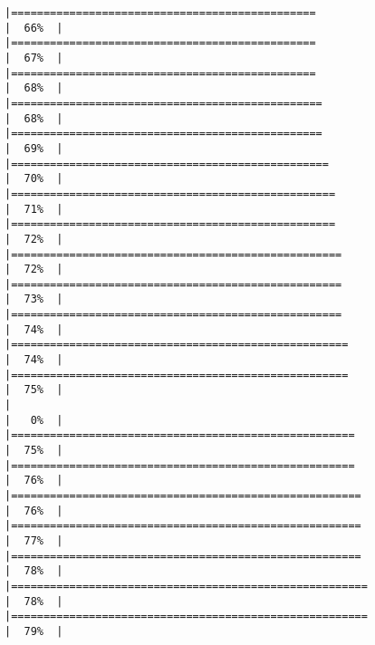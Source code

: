\documentclass[
]{article}
\begin{document}
\begin{verbatim}
|===============================================                       |  66%  |                                                                              |===============================================                       |  67%  |                                                                              |===============================================                       |  68%  |                                                                              |================================================                      |  68%  |                                                                              |================================================                      |  69%  |                                                                              |=================================================                     |  70%  |                                                                              |==================================================                    |  71%  |                                                                              |==================================================                    |  72%  |                                                                              |===================================================                   |  72%  |                                                                              |===================================================                   |  73%  |                                                                              |===================================================                   |  74%  |                                                                              |====================================================                  |  74%  |                                                                              |====================================================                  |  75%  |                                                                              |                                                                      |   0%  |                                                                              |=====================================================                 |  75%  |                                                                              |=====================================================                 |  76%  |                                                                              |======================================================                |  76%  |                                                                              |======================================================                |  77%  |                                                                              |======================================================                |  78%  |                                                                              |=======================================================               |  78%  |                                                                              |=======================================================               |  79%  |                                                                              
\end{verbatim}
\end{document}
